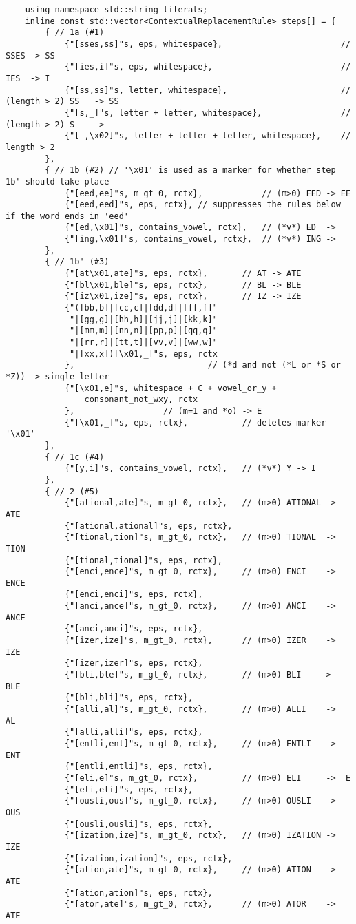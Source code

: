 \documentclass{article}
\begin{document}
\begin{appendices}
\begin{verbatim}
	using namespace std::string_literals;
	inline const std::vector<ContextualReplacementRule> steps[] = {
		{ // 1a (#1)
			{"[sses,ss]"s, eps, whitespace},						// SSES -> SS
			{"[ies,i]"s, eps, whitespace},							// IES  -> I
			{"[ss,ss]"s, letter, whitespace},						// (length > 2) SS   -> SS
			{"[s,_]"s, letter + letter, whitespace},				// (length > 2) S    ->
			{"[_,\x02]"s, letter + letter + letter, whitespace},	// length > 2
		},
		{ // 1b (#2) // '\x01' is used as a marker for whether step 1b' should take place
			{"[eed,ee]"s, m_gt_0, rctx},			// (m>0) EED -> EE
			{"[eed,eed]"s, eps, rctx}, // suppresses the rules below if the word ends in 'eed'
			{"[ed,\x01]"s, contains_vowel, rctx},	// (*v*) ED  ->
			{"[ing,\x01]"s, contains_vowel, rctx},	// (*v*) ING ->
		},
		{ // 1b' (#3)
			{"[at\x01,ate]"s, eps, rctx},		// AT -> ATE
			{"[bl\x01,ble]"s, eps, rctx},		// BL -> BLE
			{"[iz\x01,ize]"s, eps, rctx},		// IZ -> IZE
			{"([bb,b]|[cc,c]|[dd,d]|[ff,f]"
			 "|[gg,g]|[hh,h]|[jj,j]|[kk,k]"
			 "|[mm,m]|[nn,n]|[pp,p]|[qq,q]"
			 "|[rr,r]|[tt,t]|[vv,v]|[ww,w]"
			 "|[xx,x])[\x01,_]"s, eps, rctx
			},							 // (*d and not (*L or *S or *Z)) -> single letter
			{"[\x01,e]"s, whitespace + C + vowel_or_y +
				consonant_not_wxy, rctx
			},					// (m=1 and *o) -> E
			{"[\x01,_]"s, eps, rctx},			// deletes marker '\x01'
		},
		{ // 1c (#4)
			{"[y,i]"s, contains_vowel, rctx},	// (*v*) Y -> I
		},
		{ // 2 (#5)
			{"[ational,ate]"s, m_gt_0, rctx},	// (m>0) ATIONAL ->  ATE
			{"[ational,ational]"s, eps, rctx},
			{"[tional,tion]"s, m_gt_0, rctx},	// (m>0) TIONAL  ->  TION
			{"[tional,tional]"s, eps, rctx},
			{"[enci,ence]"s, m_gt_0, rctx},		// (m>0) ENCI    ->  ENCE
			{"[enci,enci]"s, eps, rctx},
			{"[anci,ance]"s, m_gt_0, rctx},		// (m>0) ANCI    ->  ANCE
			{"[anci,anci]"s, eps, rctx},
			{"[izer,ize]"s, m_gt_0, rctx},		// (m>0) IZER    ->  IZE
			{"[izer,izer]"s, eps, rctx},
			{"[bli,ble]"s, m_gt_0, rctx},		// (m>0) BLI    ->  BLE
			{"[bli,bli]"s, eps, rctx},
			{"[alli,al]"s, m_gt_0, rctx},		// (m>0) ALLI    ->  AL
			{"[alli,alli]"s, eps, rctx},
			{"[entli,ent]"s, m_gt_0, rctx},		// (m>0) ENTLI   ->  ENT
			{"[entli,entli]"s, eps, rctx},
			{"[eli,e]"s, m_gt_0, rctx},			// (m>0) ELI     ->  E
			{"[eli,eli]"s, eps, rctx},
			{"[ousli,ous]"s, m_gt_0, rctx},		// (m>0) OUSLI   ->  OUS
			{"[ousli,ousli]"s, eps, rctx},
			{"[ization,ize]"s, m_gt_0, rctx},	// (m>0) IZATION ->  IZE
			{"[ization,ization]"s, eps, rctx},
			{"[ation,ate]"s, m_gt_0, rctx},		// (m>0) ATION   ->  ATE
			{"[ation,ation]"s, eps, rctx},
			{"[ator,ate]"s, m_gt_0, rctx},		// (m>0) ATOR    ->  ATE

\end{verbatim}
\end{appendices}
\end{document}
